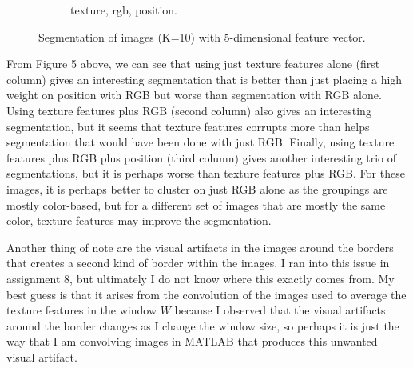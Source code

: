 \documentclass[12pt]{report}
\begin{document}
\begin{enumerate}
\begin{figure}[H]
\begin{subfigure}{0.3\linewidth}
      \caption{ texture, rgb, position.}
    \end{subfigure}
    \caption{Segmentation of images (K=10) with 5-dimensional feature vector.}
  \end{figure}

  From Figure 5 above, we can see that using just texture features alone (first
  column) gives an interesting segmentation that is better than just placing a
  high weight on position with RGB but worse than segmentation with RGB
  alone. Using texture features plus RGB (second column) also gives an
  interesting segmentation, but it seems that texture features corrupts more
  than helps segmentation that would have been done with just RGB. Finally,
  using texture features plus RGB plus position (third column) gives another
  interesting trio of segmentations, but it is perhaps worse than texture
  features plus RGB. For these images, it is perhaps better to cluster on just
  RGB alone as the groupings are mostly color-based, but for a different set of
  images that are mostly the same color, texture features may improve the
  segmentation.

  Another thing of note are the visual artifacts in the images around the
  borders that creates a second kind of border within the images. I ran into
  this issue in assignment 8, but ultimately I do not know where this exactly
  comes from. My best guess is that it arises from the convolution of the images
  used to average the texture features in the window \( W\) because I observed
  that the visual artifacts around the border changes as I change the window
  size, so perhaps it is just the way that I am convolving images in MATLAB that
  produces this unwanted visual artifact.





\end{enumerate}
\end{document}
